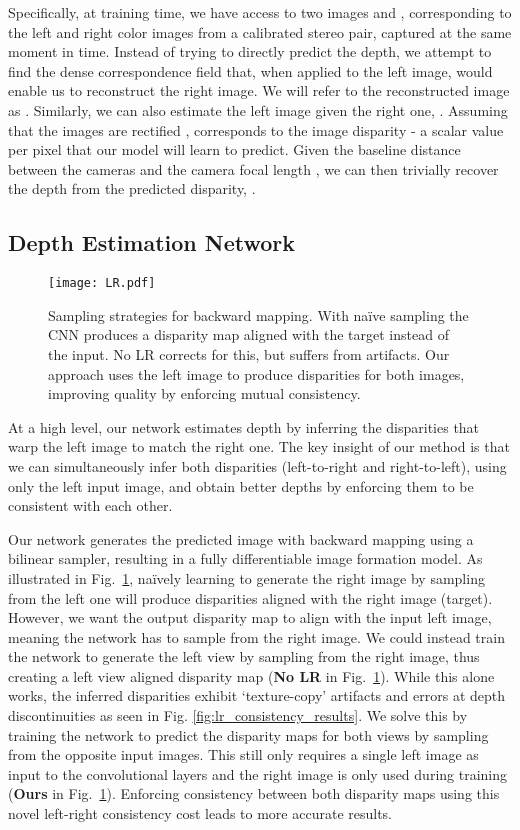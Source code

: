 \documentclass[10pt,twocolumn,letterpaper]{article}
\begin{document}
Specifically, at training time, we have access to two images  and , corresponding to the left and right color images from a calibrated stereo pair, captured at the same moment in time. 
Instead of trying to directly predict the depth, we attempt to find the dense correspondence field  that, when applied to the left image, would enable us to reconstruct the right image. 
We will refer to the reconstructed image  as . 
Similarly, we can also estimate the left image given the right one, .
Assuming that the images are rectified \cite{hartley2003multiple},  corresponds to the image disparity - a scalar value per pixel that our model will learn to predict.   
Given the baseline distance  between the cameras and the camera focal length ,  we can then trivially recover the depth  from the predicted disparity, . 


\subsection{Depth Estimation Network}

\begin{figure}[!t]
  \centering
  \texttt{[image: LR.pdf]}
  \caption{Sampling strategies for backward mapping. With na\"{i}ve sampling the CNN produces a disparity map aligned with the target instead of the input. No LR corrects for this, but suffers from artifacts. Our approach uses the left image to produce disparities for both images, improving quality by enforcing mutual consistency.}
  \label{fig:LR}
\end{figure}

At a high level, our network estimates depth by inferring the disparities that warp the left image to match the right one. 
The key insight of our method is that we can simultaneously infer both disparities (left-to-right and right-to-left), using only the left input image, and obtain better depths by enforcing them to be consistent with each other.

Our network generates the predicted image with backward mapping using a bilinear sampler, resulting in a fully differentiable image formation model. 
As illustrated in Fig.~\ref{fig:LR}, na\"ively learning to generate the right image by sampling from the left one will produce disparities aligned with the right image (target).
However, we want the output disparity map to align with the input left image, meaning the network has to sample from the right image.
We could instead train the network to generate the left view by sampling from the right image, thus creating a left view aligned disparity map (\textbf{No LR} in Fig.~\ref{fig:LR}). 
While this alone works, the inferred disparities exhibit `texture-copy' artifacts and errors at depth discontinuities as seen in Fig. \ref{fig:lr_consistency_results}.
We solve this by training the network to predict the disparity maps for both views by sampling from the opposite input images. 
This still only requires a single left image as input to the convolutional layers and the right image is only used during training (\textbf{Ours} in Fig.~\ref{fig:LR}). 
Enforcing consistency between both disparity maps using this novel left-right consistency cost leads to more accurate results.
\end{document}
